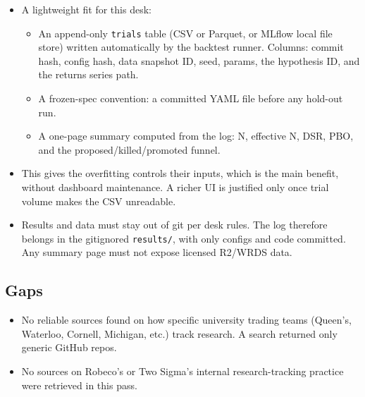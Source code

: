 \documentclass{article}
\begin{document}
\begin{itemize}

\item A lightweight fit for this desk:

\begin{itemize}

\item An append-only \texttt{trials} table (CSV or Parquet, or MLflow local file store) written automatically by the backtest runner. Columns: commit hash, config hash, data snapshot ID, seed, params, the hypothesis ID, and the returns series path.

\item A frozen-spec convention: a committed YAML file before any hold-out run.

\item A one-page summary computed from the log: N, effective N, DSR, PBO, and the proposed/\allowbreak{}killed/\allowbreak{}promoted funnel.

\end{itemize}

\item This gives the overfitting controls their inputs, which is the main benefit, without dashboard maintenance. A richer UI is justified only once trial volume makes the CSV unreadable.

\item Results and data must stay out of git per desk rules. The log therefore belongs in the gitignored \texttt{results/\allowbreak{}}, with only configs and code committed. Any summary page must not expose licensed R2/\allowbreak{}WRDS data.

\end{itemize}

\subsection{Gaps}

\begin{itemize}

\item No reliable sources found on how specific university trading teams (Queen's, Waterloo, Cornell, Michigan, etc.) track research. A search returned only generic GitHub repos.

\item No sources on Robeco's or Two Sigma's internal research-tracking practice were retrieved in this pass.

\end{itemize}
\end{document}
